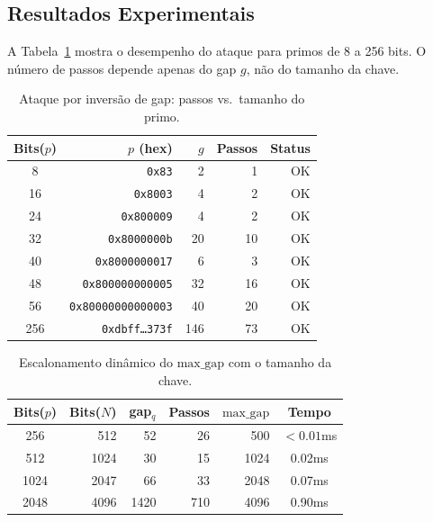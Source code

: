 \documentclass[12pt,a4paper]{article}
\theoremstyle{plain}
\begin{document}
\subsection{Resultados Experimentais}

A Tabela~\ref{tab:gap_inversion} mostra o desempenho do ataque
para primos de 8 a 256 bits.  O número de passos depende apenas
do gap $g$, não do tamanho da chave.

\begin{table}[htbp]
\centering
\caption{Ataque por inversão de gap: passos vs.\ tamanho do primo.}
\label{tab:gap_inversion}
\begin{tabular}{crrrr}
\hline
Bits($p$) & $p$ (hex) & $g$ & Passos & Status \\
\hline
8  & \texttt{0x83} & 2  & 1   & OK \\
16 & \texttt{0x8003} & 4  & 2   & OK \\
24 & \texttt{0x800009} & 4  & 2   & OK \\
32 & \texttt{0x8000000b} & 20 & 10  & OK \\
40 & \texttt{0x8000000017} & 6  & 3   & OK \\
48 & \texttt{0x800000000005} & 32 & 16  & OK \\
56 & \texttt{0x80000000000003} & 40 & 20  & OK \\
256 & \texttt{0xdbff\ldots 373f} & 146 & 73 & OK \\
\hline
\end{tabular}
\end{table}

\begin{table}[htbp]
\centering
\caption{Escalonamento dinâmico do $\text{max\_gap}$ com o tamanho da chave.}
\label{tab:gap_scaling}
\begin{tabular}{crrrrc}
\hline
Bits($p$) & Bits($N$) & gap$_q$ & Passos & $\text{max\_gap}$ & Tempo \\
\hline
256  & 512  & 52  & 26   & 500    & $<0.01$ms \\
512  & 1024 & 30  & 15   & 1024   & 0.02ms \\
1024 & 2047 & 66  & 33   & 2048   & 0.07ms \\
2048 & 4096 & 1420 & 710 & 4096   & 0.90ms \\
\hline
\end{tabular}
\end{table}
\end{document}
